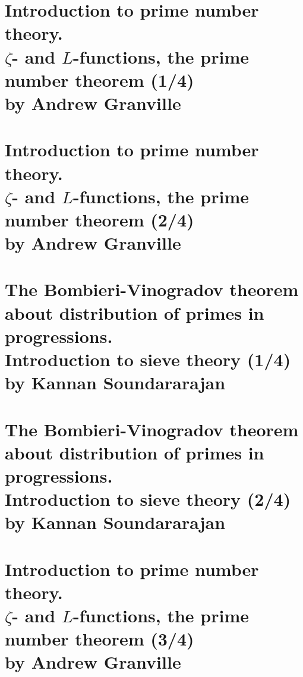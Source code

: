 \documentclass[12pt,amsfont]{amsart}
\begin{document}
\newpage
\section{Introduction to prime number theory. \\ $\zeta$- and $L$-functions,  the prime number theorem (1/4) \\by Andrew Granville}\label{1}



\newpage
\renewcommand{\thesubsection}{\arabic{section}.\arabic{subsection}}
\section{Introduction to prime number theory.\\ $\zeta$- and $L$-functions, the prime number theorem (2/4) \\by Andrew Granville}\label{2}

\newpage
\renewcommand{\thesubsection}{\arabic{section}.\arabic{subsection}}
\section{The Bombieri-Vinogradov theorem about distribution of primes in progressions. \\Introduction to sieve theory (1/4)\\by Kannan Soundararajan}\label{3}

\newpage
\renewcommand{\thesubsection}{\arabic{section}.\arabic{subsection}}
\section{The Bombieri-Vinogradov theorem about distribution of primes in progressions. \\Introduction to sieve theory (2/4)\\by Kannan Soundararajan}\label{4}

\newpage
\renewcommand{\thesubsection}{\arabic{section}.\arabic{subsection}}
\section{Introduction to prime number theory.\\ $\zeta$- and $L$-functions, the prime number theorem (3/4) \\by Andrew Granville}\label{5}

\newpage
\renewcommand{\thesubsection}{\arabic{section}.\arabic{subsection}}
\end{document}
